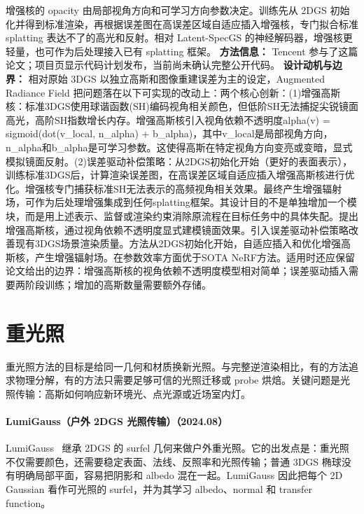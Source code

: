 增强核的 opacity 由局部视角方向和可学习方向参数决定。训练先从 2DGS 初始化并得到标准渲染，再根据误差图在高误差区域自适应插入增强核，专门拟合标准 splatting 表达不了的高光和反射。相对 Latent-SpecGS 的神经解码器，增强核更轻量，也可作为后处理接入已有 splatting 框架。
\textbf{方法信息：} Tencent 参与了这篇论文；项目页显示代码计划发布，当前尚未确认完整公开代码。
\textbf{设计动机与边界：} 相对原始 3DGS 以独立高斯和图像重建误差为主的设定，Augmented Radiance Field 把问题落在以下可实现的改动上：两个核心创新：(1)增强高斯核：标准3DGS使用球谐函数(SH)编码视角相关颜色，但低阶SH无法捕捉尖锐镜面高光，高阶SH指数增长内存。增强高斯核引入视角依赖不透明度alpha(v) = sigmoid(dot(v\_local, n\_alpha) + b\_alpha)，其中v\_local是局部视角方向，n\_alpha和b\_alpha是可学习参数。这使得高斯在特定视角方向变亮或变暗，显式模拟镜面反射。(2)误差驱动补偿策略：从2DGS初始化开始（更好的表面表示），训练标准3DGS后，计算渲染误差图，在高误差区域自适应插入增强高斯核进行优化。增强核专门捕获标准SH无法表示的高频视角相关效果。最终产生增强辐射场，可作为后处理增强集成到任何splatting框架。其设计目的不是单独增加一个模块，而是用上述表示、监督或渲染约束消除原流程在目标任务中的具体失配。提出增强高斯核，通过视角依赖不透明度显式建模镜面效果。引入误差驱动补偿策略改善现有3DGS场景渲染质量。方法从2DGS初始化开始，自适应插入和优化增强高斯核，产生增强辐射场。在参数效率方面优于SOTA NeRF方法。适用时还应保留论文给出的边界：增强高斯核的视角依赖不透明度模型相对简单；误差驱动插入需要两阶段训练；增加的高斯数量需要额外存储。

\section{重光照}

重光照方法的目标是给同一几何和材质换新光照。与完整逆渲染相比，有的方法追求物理分解，有的方法只需要足够可信的光照迁移或 probe 烘焙。关键问题是光照传输：高斯如何响应新环境光、点光源或近场室内灯。
\paragraph{LumiGauss（户外 2DGS 光照传输）（2024.08）}
LumiGauss~\cite{2408_04474} 继承 2DGS 的 surfel 几何来做户外重光照。它的出发点是：重光照不仅需要颜色，还需要稳定表面、法线、反照率和光照传输；普通 3DGS 椭球没有明确局部平面，容易把阴影和 albedo 混在一起。LumiGauss 因此把每个 2D Gaussian 看作可光照的 surfel，并为其学习 albedo、normal 和 transfer function。

